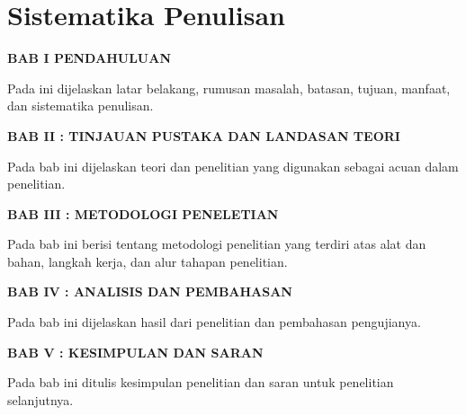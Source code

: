\section{Sistematika Penulisan}


\noindent \textbf{BAB I PENDAHULUAN}

Pada ini dijelaskan latar belakang, rumusan masalah, batasan, tujuan, manfaat, dan sistematika penulisan.

\noindent \textbf{BAB II : TINJAUAN PUSTAKA DAN LANDASAN TEORI}

Pada bab ini dijelaskan teori dan penelitian yang digunakan sebagai acuan dalam penelitian.

\noindent \textbf{BAB III : METODOLOGI PENELETIAN}

Pada bab ini berisi tentang metodologi penelitian yang terdiri atas alat dan bahan, langkah kerja, dan alur tahapan penelitian.

\noindent \textbf{BAB IV : ANALISIS DAN PEMBAHASAN}

Pada bab ini dijelaskan hasil dari penelitian dan pembahasan pengujianya.

\noindent \textbf{BAB V : KESIMPULAN DAN SARAN}

Pada bab ini ditulis kesimpulan penelitian dan saran untuk penelitian selanjutnya.
